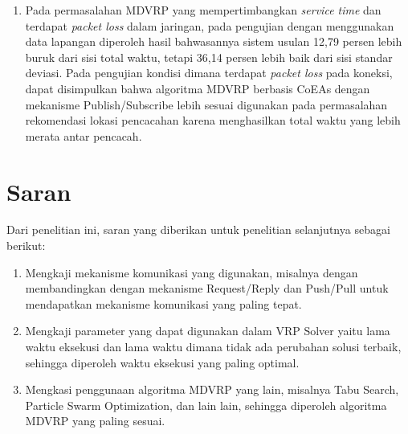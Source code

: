 \begin{enumerate}
	\item Pada permasalahan MDVRP yang mempertimbangkan \textit{service time} dan terdapat \textit{packet loss} dalam jaringan, pada pengujian dengan menggunakan data lapangan diperoleh hasil bahwasannya sistem usulan 12,79 persen lebih buruk dari sisi total waktu, tetapi 36,14 persen lebih baik dari sisi standar deviasi. Pada pengujian kondisi dimana terdapat \textit{packet loss} pada koneksi, dapat disimpulkan bahwa algoritma MDVRP berbasis CoEAs dengan mekanisme Publish/Subscribe lebih sesuai digunakan pada permasalahan rekomendasi lokasi pencacahan karena menghasilkan total waktu yang lebih merata antar pencacah.
\end{enumerate}


\section{Saran}
Dari penelitian ini, saran yang diberikan untuk penelitian selanjutnya sebagai berikut:

\begin{enumerate}
	\item Mengkaji mekanisme komunikasi yang digunakan, misalnya dengan membandingkan dengan mekanisme Request/Reply dan Push/Pull untuk mendapatkan mekanisme komunikasi yang paling tepat.
	\item Mengkaji parameter yang dapat digunakan dalam VRP Solver yaitu lama waktu eksekusi dan lama waktu dimana tidak ada perubahan solusi terbaik, sehingga diperoleh waktu eksekusi yang paling optimal.
	\item Mengkasi penggunaan algoritma MDVRP yang lain, misalnya Tabu Search, Particle Swarm Optimization, dan lain lain, sehingga diperoleh algoritma MDVRP yang paling sesuai.
\end{enumerate}
